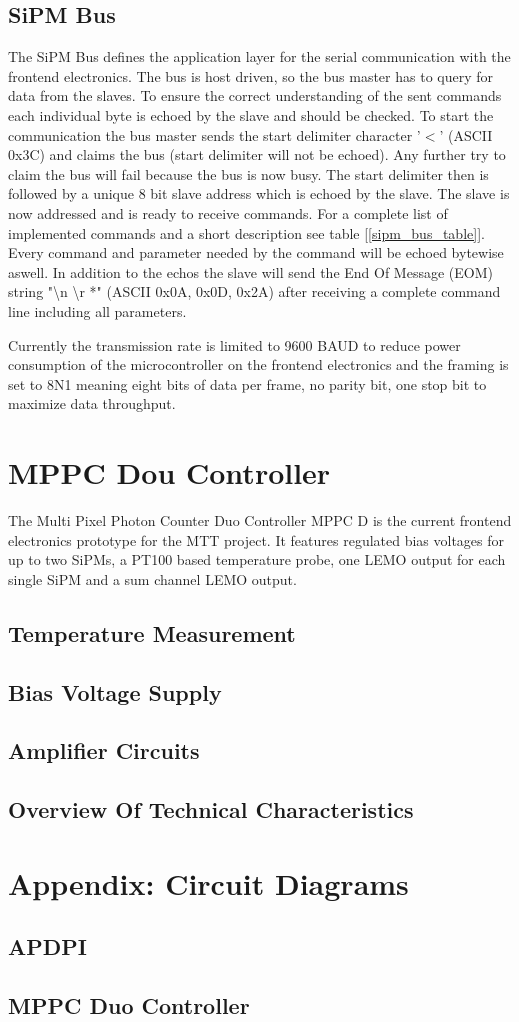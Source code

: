 \documentclass[a4paper, 12pt]{article}
\begin{document}
	\newpage
	\subsection{SiPM Bus}

The SiPM Bus defines the application layer for the serial communication with the frontend electronics. The bus is host driven, so the bus master has to query for data from the slaves.
To ensure the correct understanding of the sent commands each individual byte is echoed by the slave and should be checked. To start the communication the bus master sends the start
delimiter character '$<$' (ASCII 0x3C) and claims the bus (start delimiter will not be echoed). Any further try to claim the bus will fail because the bus is now busy. 
The start delimiter then is followed by a unique 8 bit slave address which is echoed by the slave. The slave is now addressed and is ready to receive commands. For a complete list of
implemented commands and a short description see table [\ref{sipm_bus_table}]. Every command and parameter needed by the command will be echoed bytewise aswell. In addition to the echos 
the slave will send the End Of Message (EOM) string "\textbackslash n \textbackslash r *" (ASCII 0x0A, 0x0D, 0x2A) after receiving a complete command line including all parameters.

Currently the transmission rate is limited to 9600 BAUD to reduce power consumption of the microcontroller on the frontend electronics and the framing is set to 8N1 meaning eight bits of data per frame,
no parity bit, one stop bit to maximize data throughput.

	\newpage
	\section{MPPC Dou Controller}

The Multi Pixel Photon Counter Duo Controller MPPC D is the current frontend electronics prototype for the MTT project. It features regulated bias voltages for up to two SiPMs, a PT100 based temperature
probe, one LEMO output for each single SiPM and a sum channel LEMO output. 

	\subsection{Temperature Measurement}
	\subsection{Bias Voltage Supply}
	\subsection{Amplifier Circuits}
	\subsection{Overview Of Technical Characteristics}

	\section{Appendix: Circuit Diagrams}
	\subsection{APDPI}
	\subsection{MPPC Duo Controller}
\end{document}
